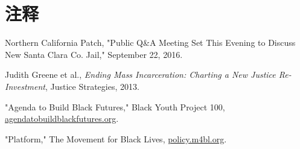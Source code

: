 \documentclass[fontset=fandol, a4paper, 12pt, openright]{ctexbook}
\begin{document}
\section*{注释}
\begin{enumerate}[label={[\arabic*]}]
    \item Northern California Patch, "Public Q\&A Meeting Set This Evening to Discuss New Santa Clara Co. Jail," September 22, 2016.
    \item Judith Greene et al., \textit{Ending Mass Incarceration: Charting a New Justice Re-Investment}, Justice Strategies, 2013.
    \item "Agenda to Build Black Futures," Black Youth Project 100, \url{agendatobuildblackfutures.org}.
    \item "Platform," The Movement for Black Lives, \url{policy.m4bl.org}.
\end{enumerate}
\end{document}
